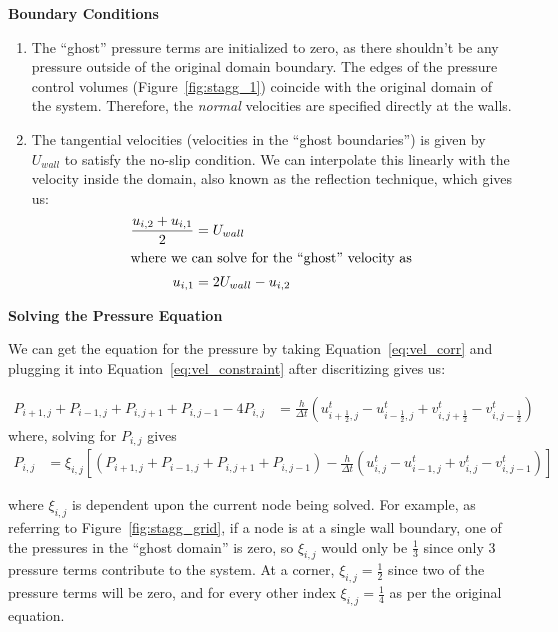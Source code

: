 \documentclass[addpoints]{exam}
\begin{document}
\begin{questions}
\begin{solution}
{\bf \large Boundary Conditions}

\begin{enumerate}
\item The ``ghost'' pressure terms are initialized to zero, as there shouldn't be any pressure outside of the original domain boundary. The edges of the pressure control volumes (Figure~\ref{fig:stagg_1}) coincide with the original domain of the system. Therefore, the {\em normal} velocities are specified directly at the walls.
\item The tangential velocities (velocities in the ``ghost boundaries'') is given by $U_{wall}$ to satisfy the no-slip condition. We can interpolate this linearly with the velocity inside the domain, also known as the reflection technique, which gives us:
\begin{align}
\frac{u_{i,2} + u_{i,1}}{2} &= U_{wall}\\
\intertext{where we can solve for the ``ghost'' velocity as}
u_{i,1} &= 2U_{wall} - u_{i,2}
\end{align}
\end{enumerate}

{\bf \large Solving the Pressure Equation}

We can get the equation for the pressure by taking Equation~\ref{eq:vel_corr} and plugging it into Equation~\ref{eq:vel_constraint} after discritizing gives us:

\begin{align}
P_{i+1,j} + P_{i-1,j} + P_{i,j+1} + P_{i,j-1} - 4P_{i,j} &= \frac{h}{\Delta t} \left( u_{i+\frac{1}{2},j}^{t} - u^{t}_{i-\frac{1}{2},j} + v^{t}_{i,j+\frac{1}{2}} - v^{t}_{i,j-\frac{1}{2}}\right)
\end{align}
where, solving for $P_{i,j}$ gives
\begin{align}
P_{i,j} &= \xi_{i,j}\left[ \left(P_{i+1,j} + P_{i-1,j} + P_{i,j+1} + P_{i,j-1}\right) - \frac{h}{\Delta t} \left( u_{i,j}^{t} - u_{i-1,j}^{t} + v_{i,j}^{t}-v_{i,j-1}^{t}\right)\right]
\end{align}

where $\xi_{i,j}$ is dependent upon the current node being solved. For example, as referring to Figure~\ref{fig:stagg_grid}, if a node is at a single wall boundary, one of the pressures in the ``ghost domain'' is zero, so $\xi_{i,j}$ would only be $\frac{1}{3}$ since only 3 pressure terms contribute to the system. At a corner, $\xi_{i,j} = \frac{1}{2}$ since two of the pressure terms will be zero, and for every other index $\xi_{i,j} = \frac{1}{4}$ as per the original equation.


\end{solution}
\end{questions}
\end{document}
